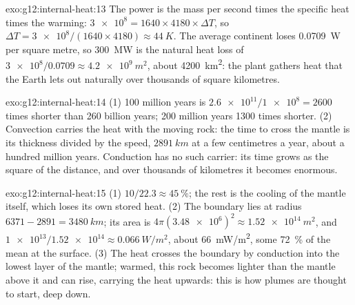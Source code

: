 \begin{solution}{exo:g12:internal-heat:13}
The power is the mass per second times the specific heat times the
warming: $\num{3e8} = 1640 \times 4180 \times \Delta T$, so $\Delta T =
\num{3e8}/(1640 \times 4180) \approx \qty{44}{K}$. The average continent loses
\qty{0.0709}{W} per square metre, so \qty{300}{MW} is the natural heat loss
of $\num{3e8}/0.0709 \approx \qty{4.2e9}{m^2}$, about \qty{4200}{km^2}:
the plant gathers heat that the Earth lets out naturally over thousands of
square kilometres.
\end{solution}

\begin{solution}{exo:g12:internal-heat:14}
(1) 100 million years is $\num{2.6e11}/\num{1e8} = 2600$ times
shorter than 260 billion years; 200 million years 1300 times shorter.
(2) Convection carries the heat with the moving rock: the time to cross the
mantle is its thickness divided by the speed, $\qty{2891}{km}$ at a few
centimetres a year, about a hundred million years. Conduction has no such
carrier: its time grows as the square of the distance, and over thousands of
kilometres it becomes enormous.
\end{solution}

\begin{solution}{exo:g12:internal-heat:15}
(1) $10/22.3 \approx \qty{45}{\percent}$; the rest is the cooling of the
mantle itself, which loses its own stored heat. (2) The boundary lies at radius $6371 - 2891 =
\qty{3480}{km}$; its area is $4\pi (\num{3.48e6})^2 \approx
\qty{1.52e14}{m^2}$, and $\num{1e13}/\num{1.52e14} \approx
\qty{0.066}{W/m^2}$, about \qty{66}{mW/m^2}, some \qty{72}{\percent} of the
mean at the surface. (3) The heat crosses the boundary by conduction into
the lowest layer of the mantle; warmed, this rock becomes lighter than the
mantle above it and can rise, carrying the heat upwards: this is how plumes
are thought to start, deep down.
\end{solution}


